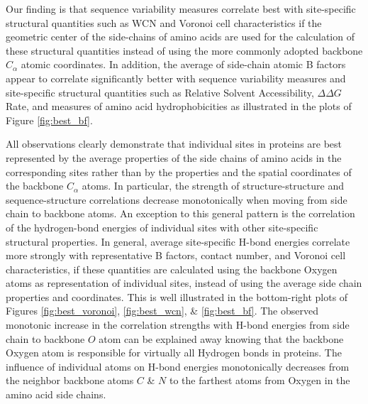 \documentclass[11pt]{article}
\newcommand{\ddg}{$\Delta\Delta G~$}
\begin{document}
        Our finding is that sequence variability measures correlate best with site-specific structural quantities such as WCN and Voronoi cell characteristics if the geometric center of the side-chains of amino acids are used for the calculation of these structural quantities instead of using the more commonly adopted backbone $C_\alpha$ atomic coordinates. In addition, the average of side-chain atomic B factors appear to correlate significantly better with sequence variability measures and site-specific structural quantities such as Relative Solvent Accessibility, \ddg Rate, and measures of amino acid hydrophobicities as illustrated in the plots of Figure \ref{fig:best_bf}.
        
        All observations clearly demonstrate that individual sites in proteins are best represented by the average properties of the side chains of amino acids in the corresponding sites rather than by the properties and the spatial coordinates of the backbone $C_\alpha$ atoms. In particular, the strength of structure-structure and sequence-structure correlations decrease monotonically when moving from side chain to backbone atoms. An exception to this general pattern is the correlation of the hydrogen-bond energies of individual sites with other site-specific structural properties. In general, average site-specific H-bond energies correlate more strongly with representative B factors, contact number, and Voronoi cell characteristics, if these quantities are calculated using the backbone Oxygen atoms as representation of individual sites, instead of using the average side chain properties and coordinates. This is well illustrated in the bottom-right plots of Figures \ref{fig:best_voronoi}, \ref{fig:best_wcn}, \& \ref{fig:best_bf}. The observed monotonic increase in the correlation strengths with H-bond energies from side chain to backbone $O$ atom can be explained away knowing that the backbone Oxygen atom is responsible for virtually all Hydrogen bonds in proteins. The influence of individual atoms on H-bond energies monotonically decreases from the neighbor backbone atoms $C$ \& $N$ to the farthest atoms from Oxygen in the amino acid side chains. \\
\end{document}
